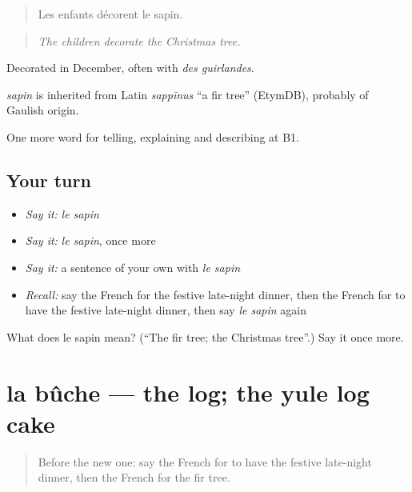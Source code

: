 \begin{quote}
Les enfants décorent le sapin.
\end{quote}

\begin{quote}
\emph{The children decorate the Christmas tree.}
\end{quote}

Decorated in December, often with \emph{des guirlandes}.

\begin{cousinweb}
\emph{sapin} is inherited from Latin \emph{sappīnus} \textquotedblleft{}a fir tree\textquotedblright{} (EtymDB), probably of Gaulish origin.
\end{cousinweb}

\begin{grammarlens}[title={What you've built}]
One more word for telling, explaining and describing at B1.
\end{grammarlens}

\subsection*{Your turn}
\begin{itemize}
\raggedright
  \item \emph{Say it:} \emph{le sapin}
  \item \emph{Say it:} \emph{le sapin}, once more
  \item \emph{Say it:} a sentence of your own with \emph{le sapin}
  \item \emph{Recall:} say the French for the festive late-night dinner, then the French for to have the festive late-night dinner, then say \emph{le sapin} again
\end{itemize}

\begin{tcolorbox}[breakable,colback=teal!4,colframe=teal!35!black,title={Before you move on}]
What does le sapin mean? (\textquotedblleft{}The fir tree; the Christmas tree\textquotedblright{}.) Say it once more.
\end{tcolorbox}
\section[la bûche]{la bûche — the log; the yule log cake}

\label{lesson:FR-C319-buche}



\begin{quote}
Before the new one: say the French for to have the festive late-night dinner, then the French for the fir tree.
\end{quote}

